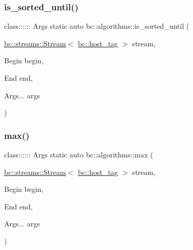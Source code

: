 \mbox{\label{namespacebc_1_1algorithms_ae61a19a001cd4acf6528f9bf5e6aef32}} 
\subsubsection{\texorpdfstring{is\+\_\+sorted\+\_\+until()}{is\_sorted\_until()}}
{\footnotesize\ttfamily class\+:::::: Args static auto bc\+::algorithms\+::is\+\_\+sorted\+\_\+until (\begin{DoxyParamCaption}\item[{\hyperlink{classbc_1_1streams_1_1Stream}{bc\+::streams\+::\+Stream}$<$ \hyperlink{structbc_1_1host__tag}{bc\+::host\+\_\+tag} $>$}]{stream,  }\item[{Begin}]{begin,  }\item[{End}]{end,  }\item[{Args...}]{args }\end{DoxyParamCaption})}

\mbox{\label{namespacebc_1_1algorithms_a8dc3d1069caa869dfff3d0b9c7b52325}} 
\subsubsection{\texorpdfstring{max()}{max()}}
{\footnotesize\ttfamily class\+:::::: Args static auto bc\+::algorithms\+::max (\begin{DoxyParamCaption}\item[{\hyperlink{classbc_1_1streams_1_1Stream}{bc\+::streams\+::\+Stream}$<$ \hyperlink{structbc_1_1host__tag}{bc\+::host\+\_\+tag} $>$}]{stream,  }\item[{Begin}]{begin,  }\item[{End}]{end,  }\item[{Args...}]{args }\end{DoxyParamCaption})}

\mbox{\label{namespacebc_1_1algorithms_a5948d3b24a0cb64879ed07cbb56d5443}} 

